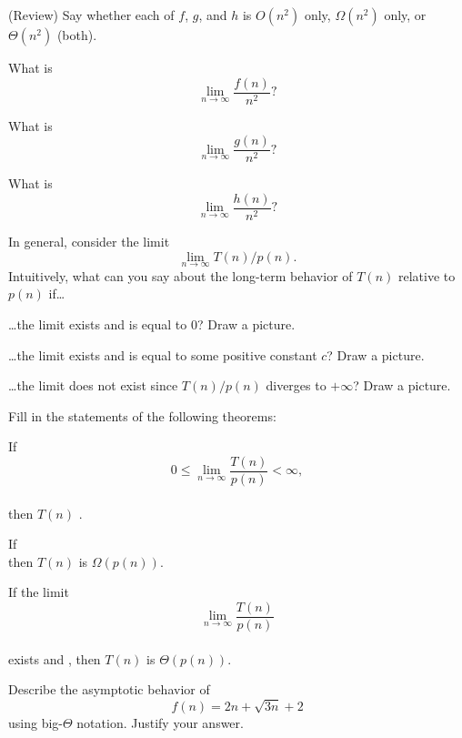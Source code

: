 \documentclass{tufte-handout}
\begin{document}
\begin{questions}
\item (Review) Say whether each of $f$, $g$, and $h$ is $O(n^2)$ only,
  $\Omega(n^2)$ only, or $\Theta(n^2)$ (\ie both).
\item What is \[ \lim_{n \to \infty} \frac{f(n)}{n^2}? \]
\item What is \[ \lim_{n \to \infty} \frac{g(n)}{n^2}? \]
\item What is \[ \lim_{n \to \infty} \frac{h(n)}{n^2}? \]
\item In general, consider the limit \[ \lim_{n \to \infty} T(n)/p(n). \]
  Intuitively, what can you say about the long-term behavior of $T(n)$
  relative to $p(n)$ if\dots
  \begin{subquestions}
    \item \dots the limit exists and is equal to $0$?  Draw a picture.
    \item \dots the limit exists and is equal to some positive
      constant $c$?  Draw a picture.
    \item \dots the limit does not exist since $T(n)/p(n)$ diverges to
      $+\infty$?  Draw a picture.
    \end{subquestions}
\item Fill in the statements of the following theorems:
\begin{thm}
  If \[ 0 \leq \lim_{n \to \infty} \frac{T(n)}{p(n)} < \infty, \]
  \\[2em] then $T(n)$ \uline{\hfill}.
\end{thm} \vspace{0.2in}
\begin{thm}
  If \\[6em] then $T(n)$ is $\Omega(p(n))$.
\end{thm} \vspace{0.2in}
\begin{thm}
  If the limit \[ \lim_{n \to \infty} \frac{T(n)}{p(n)} \] \\[2em]
  exists and \uline{\hfill}, then $T(n)$ is $\Theta(p(n))$.
\end{thm}

\item Describe the asymptotic behavior of \[ f(n) = 2n + \sqrt{3n} + 2 \]
  using big-$\Theta$ notation.  Justify your answer.

\end{questions}
\end{document}
